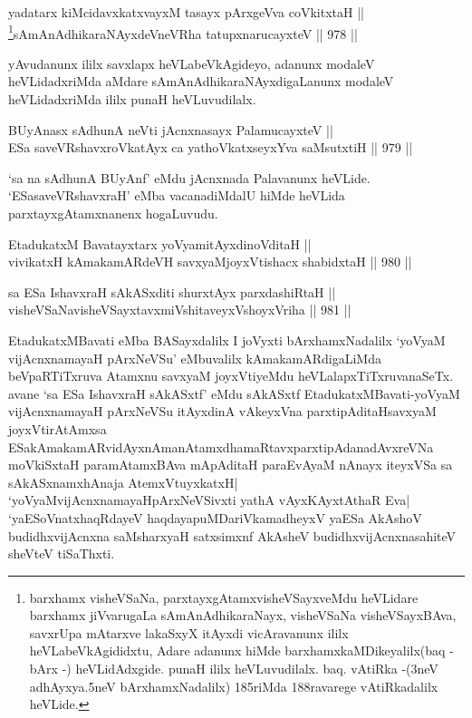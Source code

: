 \begin{shl}
yadatarx kiMcidavxkatxvayxM tasayx pArxgeVva coVkitxtaH || \\
\footnote{barxhamx visheVSaNa, parxtayxgAtamxvisheVSayxveMdu heVLidare barxhamx jiVvarugaLa sAmAnAdhikaraNayx, visheVSaNa visheVSayxBAva, savxrUpa mAtarxve lakaSxyX itAyxdi vicAravanunx ililx heVLabeVkAgididxtu, Adare adanunx hiMde barxhamxkaMDikeyalilx(baq - bArx -) heVLidAdxgide. punaH ililx heVLuvudilalx. baq. vAtiRka -(3neV adhAyxya.5neV bArxhamxNadalilx) 185riMda 188ravarege vAtiRkadalilx heVLide.}sAmAnAdhikaraNAyxdeVneVRha tatupxnarucayxteV \hfill || 978 ||  
\end{shl}


\begin{artha}
yAvudanunx ililx savxlapx heVLabeVkAgideyo, adanunx modaleV heVLidadxriMda aMdare sAmAnAdhikaraNAyxdigaLanunx modaleV heVLidadxriMda ililx punaH heVLuvudilalx.
\end{artha}


\begin{shl}
BUyAnasx sAdhunA neVti jAcnxnasayx PalamucayxteV || \\
ESa saveVRshavxroVkatAyx ca yathoVkatxseyxYva saMsutxtiH \hfill || 979 ||  
\end{shl}

\begin{artha}
`sa na sAdhunA BUyAnf' eMdu jAcnxnada Palavanunx heVLide. `ESasaveVRshavxraH' eMba vacanadiMdalU hiMde heVLida parxtayxgAtamxnanenx hogaLuvudu.
\end{artha}


\begin{shl}
EtadukatxM Bavatayxtarx yoV\s yamitAyxdinoVditaH || \\
vivikatxH kAmakamARdeVH savxyaMjoyxVtishacx shabidxtaH \hfill || 980 ||  
\end{shl}
				
\begin{shl}
sa ESa IshavxraH sAkASxditi shurxtAyx parxdashiRtaH || \\
visheVSaNavisheVSayxtavxmiVshitaveyxVshoyxVriha \hfill || 981 ||  
\end{shl}

\begin{artha}
EtadukatxMBavati eMba BASayxdalilx I joVyxti bArxhamxNadalilx `yoV\s yaM vijAcnxnamayaH pArxNeVSu' eMbuvalilx kAmakamARdigaLiMda beVpaRTiTxruva Atamxnu savxyaM joyxVtiyeMdu heVLalapxTiTxruvanaSeTx. avane `sa ESa IshavxraH sAkASxtf' eMdu sAkASxtf EtadukatxMBavati-yoV\s yaM vijAcnxnamayaH pArxNeVSu itAyxdinA vAkeyxVna parxtipAditaHsavxyaM joyxVtirAtAmxsa ESakAmakamARvidAyxnAmanAtamxdhamaRtavxparxtipAdanadAvxreVNa moVkiSxtaH paramAtamxBAva mApAditaH paraEvAyaM nAnayx iteyxVSa sa sAkASxnamxhAnaja AtemxVtuyxkatxH| `yoV\s yaMvijAcnxnamayaHpArxNeVSivxti yathA vAyxKAyxtAthaR Eva| `yaESoV\s natxhaqRdayeV haqdayapuMDariVkamadheyxV yaESa AkAshoV budidhxvijAcnxna saMsharxyaH satxsimxnf AkAsheV budidhxvijAcnxnasahiteV sheVteV tiSaThxti.
\end{artha}

